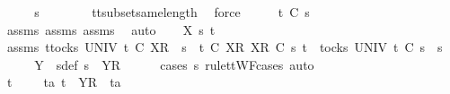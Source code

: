 \begin{isabellebody}
\ \ \isamarkupfalse%
\ \isamarkupfalse%
\ {\isachardoublequoteopen}s{}{\isacharprime}\ {\isacharequal}\ {\isacharbrackleft}{\isacharbrackright}{\isachardoublequoteclose}\isanewline
\ \ \ \ \isamarkupfalse%
\ tt{\isacharunderscore}subset{\isacharunderscore}same{\isacharunderscore}length\ \isamarkupfalse%
\ force\isanewline
\ \ \isamarkupfalse%
\ \isamarkupfalse%
\ {\isachardoublequoteopen}t\ {\isasymle}\isactrlsub C\ s{}{\isacharprime}{\isachardoublequoteclose}\isanewline
\ \ \ \ \isamarkupfalse%
\ assms{\isacharparenleft}{}{\isacharparenright}\ assms{\isacharparenleft}{}{\isacharparenright}\ assms{\isacharparenleft}{}{\isacharparenright}\ \isamarkupfalse%
\ auto\isanewline
{}\isamarkupfalse%
\isanewline
\ \ \isamarkupfalse%
\ X\ s{}{\isacharprime}\ t\isanewline
\ \ \isamarkupfalse%
\ assms{\isacharcolon}\ {\isachardoublequoteopen}{\isasymforall}t{\isasymin}tocks\ UNIV{\isachardot}\ t\ {\isasymle}\isactrlsub C\ {\isacharbrackleft}{\isacharbrackleft}X{\isacharbrackright}\isactrlsub R{\isacharbrackright}\ {\isacharat}\ s{}\ {\isasymlongrightarrow}\ t\ {\isasymle}\isactrlsub C\ {\isacharbrackleft}{\isacharbrackleft}X{\isacharbrackright}\isactrlsub R{\isacharbrackright}{\isachardoublequoteclose}\ {\isachardoublequoteopen}{\isacharbrackleft}{\isacharbrackleft}X{\isacharbrackright}\isactrlsub R{\isacharbrackright}\ {\isasymsubseteq}\isactrlsub C\ s{}{\isacharprime}{\isachardoublequoteclose}\ {\isachardoublequoteopen}t\ {\isasymin}\ tocks\ UNIV{\isachardoublequoteclose}\ {\isachardoublequoteopen}t\ {\isasymle}\isactrlsub C\ s{}{\isacharprime}\ {\isacharat}\ s{}{\isachardoublequoteclose}\isanewline
\ \ \isamarkupfalse%
\ \isamarkupfalse%
\ Y\ \ s{}{\isacharprime}{\isacharunderscore}def{\isacharcolon}\ {\isachardoublequoteopen}s{}{\isacharprime}\ {\isacharequal}\ {\isacharbrackleft}{\isacharbrackleft}Y{\isacharbrackright}\isactrlsub R{\isacharbrackright}{\isachardoublequoteclose}\isanewline
\ \ \ \ \isamarkupfalse%
\ {\isacharparenleft}cases\ s{}{\isacharprime}\ rule{\isacharcolon}ttWF{\isachardot}cases{\isacharcomma}\ auto{\isacharparenright}\isanewline
\ \ \isamarkupfalse%
\ \isamarkupfalse%
\ {\isachardoublequoteopen}t\ {\isacharequal}\ {\isacharbrackleft}{\isacharbrackright}\ {\isasymor}\ {\isacharparenleft}{\isasymexists}\ ta{\isachardot}\ t\ {\isacharequal}\ {\isacharbrackleft}Y{\isacharbrackright}\isactrlsub R\ {\isacharhash}\ ta{\isacharparenright}{\isachardoublequoteclose}\isanewline

\end{isabellebody}
